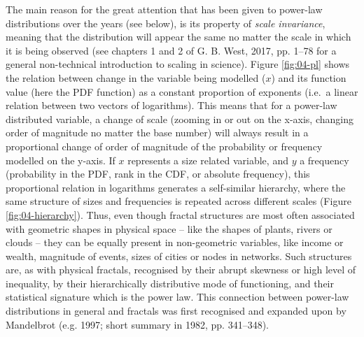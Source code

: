 \documentclass[
  12pt,
]{book}
\begin{document}
The main reason for the great attention that has been given to power-law distributions over the years (see below), is its property of \emph{scale invariance}, meaning that the distribution will appear the same no matter the scale in which it is being observed (see chapters 1 and 2 of G. B. West, 2017, pp. 1--78 for a general non-technical introduction to scaling in science). Figure \ref{fig:04-pl} shows the relation between change in the variable being modelled (\(x\)) and its function value (here the PDF function) as a constant proportion of exponents (i.e.~a linear relation between two vectors of logarithms). This means that for a power-law distributed variable, a change of scale (zooming in or out on the x-axis, changing order of magnitude no matter the base number) will always result in a proportional change of order of magnitude of the probability or frequency modelled on the y-axis. If \(x\) represents a size related variable, and \(y\) a frequency (probability in the PDF, rank in the CDF, or absolute frequency), this proportional relation in logarithms generates a self-similar hierarchy, where the same structure of sizes and frequencies is repeated across different scales (Figure \ref{fig:04-hierarchy}). Thus, even though fractal structures are most often associated with geometric shapes in physical space -- like the shapes of plants, rivers or clouds -- they can be equally present in non-geometric variables, like income or wealth, magnitude of events, sizes of cities or nodes in networks. Such structures are, as with physical fractals, recognised by their abrupt skewness or high level of inequality, by their hierarchically distributive mode of functioning, and their statistical signature which is the power law. This connection between power-law distributions in general and fractals was first recognised and expanded upon by Mandelbrot (e.g. 1997; short summary in 1982, pp. 341--348).
\end{document}
